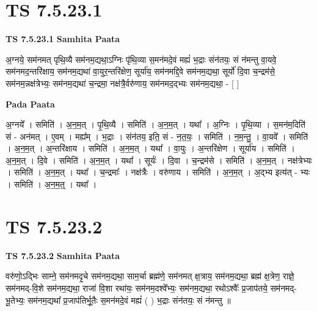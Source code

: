 \documentclass[17pt]{extarticle}
\begin{document}
\section*{ TS 7.5.23.1 }

\textbf{TS 7.5.23.1 } \newline
\textbf{Samhita Paata} \newline

अ॒ग्नये॒ सम॑नमत् पृथि॒व्यै सम॑नम॒द्यथा॒ऽग्निः पृ॑थि॒व्या स॒मन॑मदे॒वं मह्यं॑ भ॒द्राः संन॑तयः॒ सं न॑मन्तु वा॒यवे॒ सम॑नमद॒न्तरि॑क्षाय॒ सम॑नम॒द्यथा॑ वा॒युर॒न्तरि॑क्षेण॒ सूर्या॑य॒ सम॑नमद्दि॒वे सम॑नम॒द्यथा॒ सूर्यो॑ दि॒वा च॒न्द्रम॑से॒ सम॑नम॒न्नक्ष॑त्रेभ्यः॒ सम॑नम॒द्यथा॑ च॒न्द्रमा॒ नक्ष॑त्रै॒र्वरु॑णाय॒ सम॑नमद॒द्भ्यः सम॑नम॒द्यथा॒ - [  ] \newline

\textbf{Pada Paata} \newline

अ॒ग्नये᳚ । समिति॑ । अ॒न॒म॒त् । पृ॒थि॒व्यै । समिति॑ । अ॒न॒म॒त् । यथा᳚ । अ॒ग्निः । पृ॒थि॒व्या । स॒मन॑म॒दिति॑ सं - अन॑मत् । ए॒वम् । मह्य᳚म् । भ॒द्राः । संन॑तय॒ इति॒ सं - न॒त॒यः॒ । समिति॑ । न॒म॒न्तु॒ । वा॒यवे᳚ । समिति॑ । अ॒न॒म॒त् । अ॒न्तरि॑क्षाय । समिति॑ । अ॒न॒म॒त् । यथा᳚ । वा॒युः । अ॒न्तरि॑क्षेण । सूर्या॑य । समिति॑ । अ॒न॒म॒त् । दि॒वे । समिति॑ । अ॒न॒म॒त् । यथा᳚ । सूर्यः॑ । दि॒वा । च॒न्द्रम॑से । समिति॑ । अ॒न॒म॒त् । नक्ष॑त्रेभ्यः । समिति॑ । अ॒न॒म॒त् । यथा᳚ । च॒न्द्रमाः᳚ । नक्ष॑त्रैः । वरु॑णाय । समिति॑ । अ॒न॒म॒त् । अ॒द्भ्य इत्य॑त् - भ्यः । समिति॑ । अ॒न॒म॒त्॒ । यथा᳚ ।  \newline




\section*{ TS 7.5.23.2 }

\textbf{TS 7.5.23.2 } \newline
\textbf{Samhita Paata} \newline

वरु॑णो॒ऽद्भिः साम्ने॒ सम॑नमदृ॒चे सम॑नम॒द्यथा॒ साम॒र्चा ब्रह्म॑णे॒ सम॑नमत् क्ष॒त्राय॒ सम॑नम॒द्यथा॒ ब्रह्म॑ क्ष॒त्रेण॒ राज्ञे॒ सम॑नमद्-वि॒शे सम॑नम॒द्यथा॒ राजा॑ वि॒शा रथा॑यः॒ सम॑नम॒दश्वे᳚भ्यः॒ सम॑नम॒द्यथा॒ रथोऽश्वैः᳚ प्र॒जाप॑तये॒ सम॑नमद्-भू॒तेभ्यः॒ सम॑नम॒द्यथा᳚ प्र॒जाप॑तिर्भू॒तैः स॒मन॑मदे॒वं मह्यं॑ ( ) भ॒द्राः संन॑तयः॒ सं न॑मन्तु ॥ \newline
\end{document}
